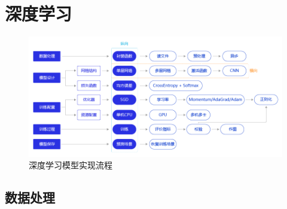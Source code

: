 \chapter{深度学习}

\begin{figure}[htp]
    \centering
    \includegraphics[width=14cm]{figure/深度学习模型实现流程.png}
    \caption{\kaishu 深度学习模型实现流程}\label{Fig: 深度学习模型实现流程}
\end{figure}

\section{数据处理}


